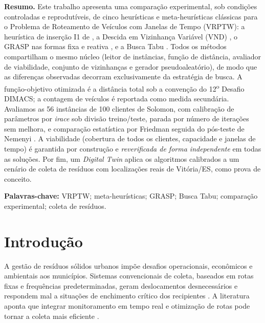 \documentclass[12pt, a4paper]{article}
\begin{document}
\noindent\textbf{Resumo.} Este trabalho apresenta uma comparação experimental, sob condições controladas e reprodutíveis, de cinco heurísticas e meta-heurísticas clássicas para o Problema de Roteamento de Veículos com Janelas de Tempo (VRPTW): a heurística de inserção I1 de \citet{solomon1987algorithms}, a Descida em Vizinhança Variável (VND) \citep{hansen2001variable}, o GRASP \citep{feo1995greedy} nas formas fixa e reativa \citep{prais2000reactive}, e a Busca Tabu \citep{glover1989tabu}. Todos os métodos compartilham o mesmo núcleo (leitor de instâncias, função de distância, avaliador de viabilidade, conjunto de vizinhanças e gerador pseudoaleatório), de modo que as diferenças observadas decorram exclusivamente da estratégia de busca. A função-objetivo otimizada é a distância total sob a convenção do 12\textsuperscript{o} Desafio DIMACS; a contagem de veículos é reportada como medida secundária. Avaliamos as 56 instâncias de 100 clientes de Solomon, com calibração de parâmetros por \textit{irace} \citep{lopez2016irace} sob divisão treino/teste, parada por número de iterações sem melhora, e comparação estatística por Friedman seguida do pós-teste de Nemenyi \citep{demsar2006statistical}. A viabilidade (cobertura de todos os clientes, capacidade e janelas de tempo) é garantida por construção e \emph{reverificada de forma independente} em todas as soluções. Por fim, um \textit{Digital Twin} aplica os algoritmos calibrados a um cenário de coleta de resíduos com localizações reais de Vitória/ES, como prova de conceito.

\medskip
\noindent\textbf{Palavras-chave:} VRPTW; meta-heurísticas; GRASP; Busca Tabu; comparação experimental; coleta de resíduos.

\section{Introdução}\label{sec:intro}

A gestão de resíduos sólidos urbanos impõe desafios operacionais, econômicos e ambientais aos municípios. Sistemas convencionais de coleta, baseados em rotas fixas e frequências predeterminadas, geram deslocamentos desnecessários e respondem mal a situações de enchimento crítico dos recipientes \citep{pardini2020smart,lozano2018smart}. A literatura aponta que integrar monitoramento em tempo real e otimização de rotas pode tornar a coleta mais eficiente \citep{lozano2018smart,barth2023data}.
\end{document}
